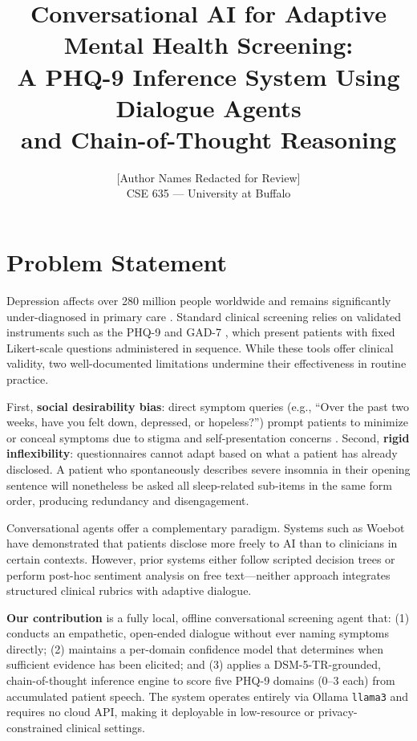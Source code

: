 \documentclass[11pt,twocolumn]{article}
\title{Conversational AI for Adaptive Mental Health Screening:\\
A PHQ-9 Inference System Using Dialogue Agents\\and Chain-of-Thought Reasoning}
\author{
  [Author Names Redacted for Review]\\
  CSE 635 --- University at Buffalo
}
\makeatletter
\renewcommand{\maketitle}{%
  \twocolumn[{%
    \centering
    {\Large\bfseries\@title\par}
    \vskip 0.8em
    {\normalsize\@author\par}
    \vskip 1.2em
  }]%
}
\makeatother
\begin{document}
\maketitle

\section{Problem Statement}

Depression affects over 280 million people worldwide and remains significantly under-diagnosed in primary care \citep{guo2023survey}. Standard clinical screening relies on validated instruments such as the PHQ-9 \citep{kroenke2001phq} and GAD-7 \citep{kroenke2007anxiety}, which present patients with fixed Likert-scale questions administered in sequence. While these tools offer clinical validity, two well-documented limitations undermine their effectiveness in routine practice.

First, \textbf{social desirability bias}: direct symptom queries (e.g., ``Over the past two weeks, have you felt down, depressed, or hopeless?'') prompt patients to minimize or conceal symptoms due to stigma and self-presentation concerns \citep{yang2023evaluations}. Second, \textbf{rigid inflexibility}: questionnaires cannot adapt based on what a patient has already disclosed. A patient who spontaneously describes severe insomnia in their opening sentence will nonetheless be asked all sleep-related sub-items in the same form order, producing redundancy and disengagement.

Conversational agents offer a complementary paradigm. Systems such as Woebot \citep{woebot2017} have demonstrated that patients disclose more freely to AI than to clinicians in certain contexts. However, prior systems either follow scripted decision trees or perform post-hoc sentiment analysis on free text—neither approach integrates structured clinical rubrics with adaptive dialogue.

\textbf{Our contribution} is a fully local, offline conversational screening agent that: (1) conducts an empathetic, open-ended dialogue without ever naming symptoms directly; (2) maintains a per-domain confidence model that determines when sufficient evidence has been elicited; and (3) applies a DSM-5-TR-grounded, chain-of-thought \citep{wei2022chain} inference engine to score five PHQ-9 domains (0--3 each) from accumulated patient speech. The system operates entirely via Ollama \texttt{llama3} and requires no cloud API, making it deployable in low-resource or privacy-constrained clinical settings.
\end{document}
